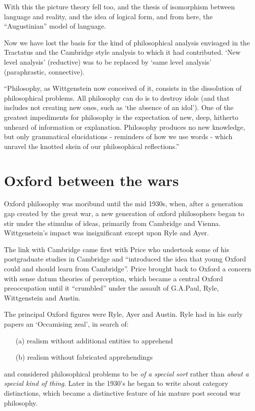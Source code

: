 With this the picture theory fell too, and the thesis of isomorphism between language and reality, and the idea of logical form, and from here, the ``Augustinian'' model of language.


Now we have lost the basis for the kind of philosophical analysis envisaged in the Tractatus and the Cambridge style analysis to which it had contributed.
`New level analysis' (reductive)  was to be replaced by `same level analysis' (paraphrastic, connective).


``Philosophy, as Wittgenstein now conceived of it, consists in the dissolution of philosophical problems.
All philosophy can do is to destroy idols (and that includes not creating new ones, such as `the absence of an idol').
One of the greatest impediments for philosophy is the expectation of new, deep, hitherto unheard of information or explanation.
Philosophy produces no new knowledge, but only grammatical elucidations - reminders of how we use words - which unravel the knotted skein of our philosophical reflections.''

\section{Oxford between the wars}


Oxford philosophy was moribund until the mid 1930s, when, after a generation gap created by the great war, a new generation of oxford philosophers began to stir under the stimulus of ideas, primarily from Cambridge and Vienna.
Wittgenstein's impact was insignificant except upon Ryle and Ayer.

The link with Cambridge came first with Price who undertook some of his postgraduate studies in Cambridge and ``introduced the idea that young Oxford could and should learn from Cambridge''.
Price brought back to Oxford a concern with sense datum theories of perception, which became a central Oxford preoccupation until it ``crumbled'' under the assault of G.A.Paul, Ryle, Wittgenstein and Austin.

The principal Oxford figures were Ryle, Ayer and Austin.
Ryle had in his early papers an `Occamising zeal', in search of:
\begin{itemize}
\item[(a)] realism without additional entities to apprehend
\item[(b)] realism without fabricated apprehendings
\end{itemize}
and considered philosophical problems to be {\it of a special sort} rather than {\it about a special kind of thing}.
Later in the 1930's he began to write about category distinctions, which became a distinctive feature of his mature post second war philosophy.

